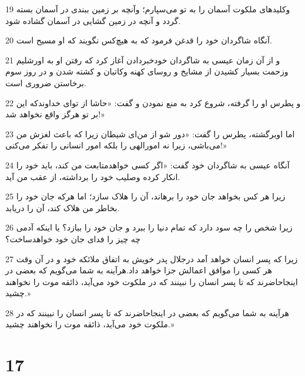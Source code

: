\par 19 وکلیدهای ملکوت آسمان را به تو می‌سپارم؛ وآنچه بر زمین ببندی در آسمان بسته گردد و آنچه در زمین گشایی در آسمان گشاده شود.
\par 20 آنگاه شاگردان خود را قدغن فرمود که به هیچ‌کس نگویند که او مسیح است.
\par 21 و از آن زمان عیسی به شاگردان خودخبردادن آغاز کرد که رفتن او به اورشلیم وزحمت بسیار کشیدن از مشایخ و روسای کهنه وکاتبان و کشته شدن و در روز سوم برخاستن ضروری است.
\par 22 و پطرس او را گرفته، شروع کرد به منع نمودن و گفت: «حاشا از تو‌ای خداوندکه این بر تو هرگز واقع نخواهد شد!»
\par 23 اما اوبرگشته، پطرس را گفت: «دور شو از من‌ای شیطان زیرا که باعث لغزش من می‌باشی، زیرا نه امورالهی را بلکه امور انسانی را تفکر می‌کنی!»
\par 24 آنگاه عیسی به شاگردان خود گفت: «اگر کسی خواهدمتابعت من کند، باید خود را انکار کرده وصلیب خود را برداشته، از عقب من آید.
\par 25 زیرا هر کس بخواهد جان خود را برهاند، آن را هلاک سازد؛ اما هر‌که جان خود را بخاطر من هلاک کند، آن را دریابد.
\par 26 زیرا شخص را چه سود دارد که تمام دنیا را ببرد و جان خود را ببازد؟ یا اینکه آدمی چه چیز را فدای جان خود خواهدساخت؟
\par 27 زیرا که پسر انسان خواهد آمد درجلال پدر خویش به اتفاق ملائکه خود و در آن وقت هر کسی را موافق اعمالش جزا خواهد داد.هرآینه به شما می‌گویم که بعضی در اینجاحاضرند که تا پسر انسان را نبینند که در ملکوت خود می‌آید، ذائقه موت را نخواهند چشید.»
\par 28 هرآینه به شما می‌گویم که بعضی در اینجاحاضرند که تا پسر انسان را نبینند که در ملکوت خود می‌آید، ذائقه موت را نخواهند چشید.»

\chapter{17}

